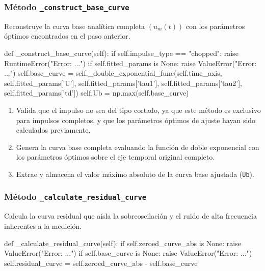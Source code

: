 \subsubsection{Método \texttt{\_construct\_base\_curve}}
Reconstruye la curva base analítica completa $(u_m(t))$ con los parámetros óptimos encontrados en el paso anterior.

\begin{python}
def _construct_base_curve(self):
    if self.impulse_type == "chopped":
        raise RuntimeError("Error: ...")
    if self.fitted_params is None:
        raise ValueError("Error: ...")
    self.base_curve = self._double_exponential_func(self.time_axis,
                                                    self.fitted_params['U'],
                                                    self.fitted_params['tau1'],
                                                    self.fitted_params['tau2'],
                                                    self.fitted_params['td'])
    self.Ub = np.max(self.base_curve)
\end{python}

\begin{enumerate}
    \item Valida que el impulso no sea del tipo cortado, ya que este método es exclusivo para impulsos completos, y que los parámetros óptimos de ajuste hayan sido calculados previamente.
    \item Genera la curva base completa evaluando la función de doble exponencial con los parámetros óptimos sobre el eje temporal original completo.
    \item Extrae y almacena el valor máximo absoluto de la curva base ajustada (\texttt{Ub}).
\end{enumerate}

\subsubsection{Método \texttt{\_calculate\_residual\_curve}}
Calcula la curva residual que aísla la sobreoscilación y el ruido de alta frecuencia inherentes a la medición.

\begin{python}
def _calculate_residual_curve(self):
    if self.zeroed_curve_abs is None:
        raise ValueError("Error: ...")
    if self.base_curve is None:
        raise ValueError("Error: ...")
    self.residual_curve = self.zeroed_curve_abs - self.base_curve
\end{python}

